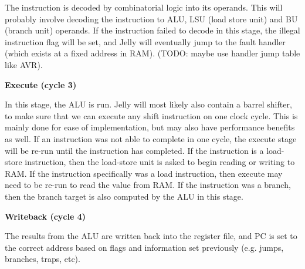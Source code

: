 \documentclass{article}
\begin{document}
The instruction is decoded by combinatorial logic into its operands. This will probably involve decoding the
instruction to ALU, LSU (load store unit) and BU (branch unit) operands. If the instruction failed to decode
in this stage, the illegal instruction flag will be set, and Jelly will eventually jump to the fault handler
(which exists at a fixed address in RAM). (TODO: maybe use handler jump table like AVR).

\textbf{Execute (cycle 3)}

In this stage, the ALU is run. Jelly will most likely also contain a barrel shifter, to make sure that we can
execute any shift instruction on one clock cycle. This is mainly done for ease of implementation, but may
also have performance benefits as well. If an instruction was not able to complete in one cycle, the execute
stage will be re-run until the instruction has completed. If the instruction is a load-store instruction,
then the load-store unit is asked to begin reading or writing to RAM. If the instruction specifically was a
load instruction, then execute may need to be re-run to read the value from RAM. If the instruction was a
branch, then the branch target is also computed by the ALU in this stage.

\textbf{Writeback (cycle 4)}

The results from the ALU are written back into the register file, and PC is set to the correct address based
on flags and information set previously (e.g. jumps, branches, traps, etc).
\end{document}
